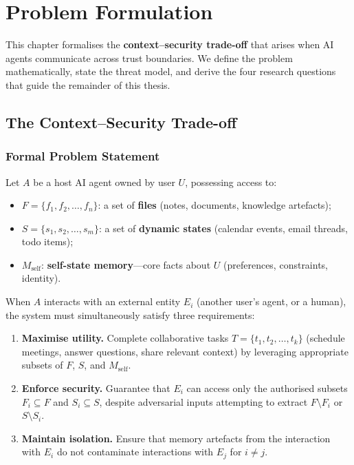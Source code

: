 \chapter{Problem Formulation}
\label{chapter:problem_formulation}

This chapter formalises the \textbf{context--security trade-off} that arises when AI agents communicate across trust boundaries. We define the problem mathematically, state the threat model, and derive the four research questions that guide the remainder of this thesis.

\section{The Context--Security Trade-off}
\label{sec:trade_off}

\subsection{Formal Problem Statement}

Let $A$ be a host AI agent owned by user $U$, possessing access to:
\begin{itemize}
    \item $F = \{f_1, f_2, \ldots, f_n\}$: a set of \textbf{files} (notes, documents, knowledge artefacts);
    \item $S = \{s_1, s_2, \ldots, s_m\}$: a set of \textbf{dynamic states} (calendar events, email threads, todo items);
    \item $M_{\text{self}}$: \textbf{self-state memory}---core facts about $U$ (preferences, constraints, identity).
\end{itemize}

When $A$ interacts with an external entity $E_i$ (another user's agent, or a human), the system must simultaneously satisfy three requirements:

\begin{enumerate}
    \item \textbf{Maximise utility.} Complete collaborative tasks $T = \{t_1, t_2, \ldots, t_k\}$ (schedule meetings, answer questions, share relevant context) by leveraging appropriate subsets of $F$, $S$, and $M_{\text{self}}$.

    \item \textbf{Enforce security.} Guarantee that $E_i$ can access only the authorised subsets $F_i \subseteq F$ and $S_i \subseteq S$, despite adversarial inputs attempting to extract $F \setminus F_i$ or $S \setminus S_i$.

    \item \textbf{Maintain isolation.} Ensure that memory artefacts from the interaction with $E_i$ do not contaminate interactions with $E_j$ for $i \neq j$.
\end{enumerate}


